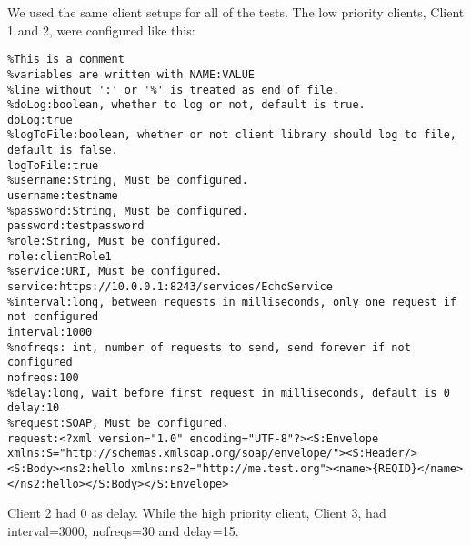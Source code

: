     We used the same client setups for all of the tests. The low priority clients, Client 1 and 2, were configured like this:
\lstset{language=matlab}
\begin{lstlisting}
%This is a comment
%variables are written with NAME:VALUE
%line without ':' or '%' is treated as end of file.
%doLog:boolean, whether to log or not, default is true.
doLog:true
%logToFile:boolean, whether or not client library should log to file, default is false.
logToFile:true
%username:String, Must be configured.
username:testname
%password:String, Must be configured.
password:testpassword
%role:String, Must be configured.
role:clientRole1
%service:URI, Must be configured.
service:https://10.0.0.1:8243/services/EchoService
%interval:long, between requests in milliseconds, only one request if not configured
interval:1000
%nofreqs: int, number of requests to send, send forever if not configured
nofreqs:100
%delay:long, wait before first request in milliseconds, default is 0
delay:10
%request:SOAP, Must be configured.
request:<?xml version="1.0" encoding="UTF-8"?><S:Envelope xmlns:S="http://schemas.xmlsoap.org/soap/envelope/"><S:Header/><S:Body><ns2:hello xmlns:ns2="http://me.test.org"><name>{REQID}</name></ns2:hello></S:Body></S:Envelope>
\end{lstlisting}
    Client 2 had 0 as delay. While the high priority client, Client 3, had interval=3000, nofreqs=30 and delay=15.
